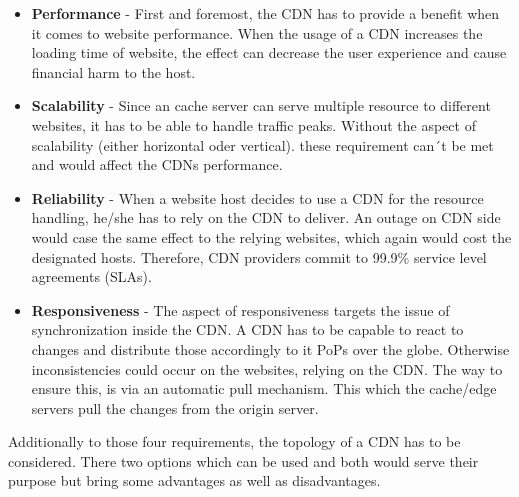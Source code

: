 \begin{itemize}
	\item \textbf{Performance} - First and foremost, the CDN has to provide a benefit when it comes to website performance. When the usage of a CDN increases the loading time of website, the effect can decrease the user experience and cause financial harm to the host. \cite{cdn_general}
	\item \textbf{Scalability} - Since an cache server can serve multiple resource to different websites, it has to be able to handle traffic peaks. Without the aspect of scalability (either horizontal oder vertical). these requirement can´t be met and would affect the CDNs performance.
	\item \textbf{Reliability} -  When a website host decides to use a CDN for the resource handling, he/she has to rely on the CDN to deliver. An outage on CDN side would case the same effect to the relying websites, which again would cost the designated hosts. Therefore, CDN providers commit to 99.9\% service level agreements (SLAs).
	\item \textbf{Responsiveness} -  The aspect of responsiveness targets the issue of synchronization inside the CDN. A CDN has to be capable to react to changes and distribute those accordingly to it PoPs over the globe. Otherwise inconsistencies could occur on the websites, relying on the CDN. The way to ensure this, is via an automatic pull mechanism. This which the cache/edge servers pull the changes from the origin server.\cite{cdn_origin_server}
\end{itemize}

Additionally to those four requirements, the topology of a CDN has to be considered. There two options which can be used and both would serve their purpose but bring some advantages as well as disadvantages. 

